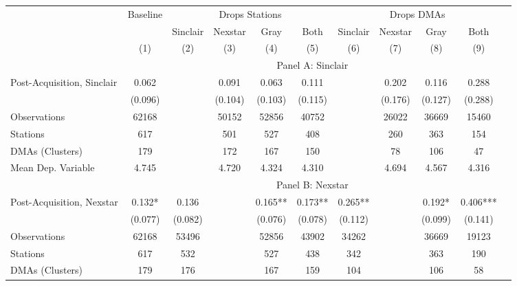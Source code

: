 {\def \sym#1{\ifmmode^{#1}\else\(^{#1}\)\fi} \begin{tabular}{l*{10}{c}} \toprule \ & \multicolumn{1}{c}{Baseline} & \multicolumn{4}{c}{Drops Stations}   & \multicolumn{4}{c}{Drops DMAs} \\ \cmidrule(lr){2-2}\cmidrule(lr){3-6}\cmidrule(lr){7-10} \ & 
 & Sinclair & Nexstar & Gray & Both & Sinclair & Nexstar & Gray & Both \\  \ & (1) & (2) & (3) & (4) & (5) & (6)  & (7)  & (8)  & (9) \\
\midrule \ & \multicolumn{9}{c}{Panel A: Sinclair} \\\cmidrule(lr){2-10}
Post-Acquisition, Sinclair&    0.062   &         &    0.091   &    0.063   &    0.111   &         &    0.202   &    0.116   &    0.288   \\
                &  (0.096)   &         &  (0.104)   &  (0.103)   &  (0.115)   &         &  (0.176)   &  (0.127)   &  (0.288)   \\
\midrule
Observations    &    62168   &         &    50152   &    52856   &    40752   &         &    26022   &    36669   &    15460   \\
Stations        &      617   &         &      501   &      527   &      408   &         &      260   &      363   &      154   \\
DMAs (Clusters) &      179   &         &      172   &      167   &      150   &         &       78   &      106   &       47   \\
Mean Dep. Variable&    4.745   &         &    4.720   &    4.324   &    4.310   &         &    4.694   &    4.567   &    4.316   \\
\midrule \ & \multicolumn{9}{c}{Panel B: Nexstar} \\\cmidrule(lr){2-10}
Post-Acquisition, Nexstar&    0.132*  &    0.136   &         &    0.165** &    0.173** &    0.265** &         &    0.192*  &    0.406***\\
                &  (0.077)   &  (0.082)   &         &  (0.076)   &  (0.078)   &  (0.112)   &         &  (0.099)   &  (0.141)   \\
\midrule
Observations    &    62168   &    53496   &         &    52856   &    43902   &    34262   &         &    36669   &    19123   \\
Stations        &      617   &      532   &         &      527   &      438   &      342   &         &      363   &      190   \\
DMAs (Clusters) &      179   &      176   &         &      167   &      159   &      104   &         &      106   &       58   \\

\end{tabular}}
